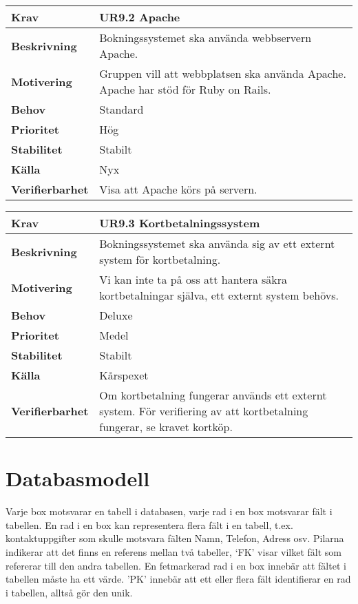 \documentclass[a4paper, twoside, 11pt, titlepage]{article}
\begin{document}
		\begin{tabular} { p{2.6cm} p{12.5cm} }
			\hline
			\sffamily\textbf{Krav} & \sffamily\textbf{UR9.2 Apache } \\
			\hline
			\sffamily\textbf{Beskrivning} & Bokningssystemet ska använda webbservern Apache.  \\
			\hline
			\sffamily\textbf{Motivering} & Gruppen vill att webbplatsen ska använda Apache. Apache har stöd för Ruby on Rails.  \\
			\hline
			\sffamily\textbf{Behov} & Standard  \\
			\hline
			\sffamily\textbf{Prioritet} & Hög  \\
			\hline
			\sffamily\textbf{Stabilitet} & Stabilt  \\
			\hline
			\sffamily\textbf{Källa} & Nyx  \\
			\hline
			\sffamily\textbf{Verifierbarhet} & Visa att Apache körs på servern.  \\
			\hline
		\end{tabular}
		\vspace{6mm}

		\begin{tabular} { p{2.6cm} p{12.5cm} }
			\hline
			\sffamily\textbf{Krav} & \sffamily\textbf{UR9.3 Kortbetalningssystem } \\
			\hline
			\sffamily\textbf{Beskrivning} & Bokningssystemet ska använda sig av ett externt system för kortbetalning.  \\
			\hline
			\sffamily\textbf{Motivering} & Vi kan inte ta på oss att hantera säkra kortbetalningar själva, ett externt system behövs.  \\
			\hline
			\sffamily\textbf{Behov} & Deluxe  \\
			\hline
			\sffamily\textbf{Prioritet} & Medel  \\
			\hline
			\sffamily\textbf{Stabilitet} & Stabilt  \\
			\hline
			\sffamily\textbf{Källa} & Kårspexet  \\
			\hline
			\sffamily\textbf{Verifierbarhet} & Om kortbetalning fungerar används ett externt system. För verifiering av att kortbetalning fungerar, se kravet kortköp.  \\
			\hline
		\end{tabular}


\clearpage
	\appendix

\clearpage
\section{Databasmodell}


Varje box motsvarar en tabell i databasen, varje rad i en box motsvarar fält i tabellen. En rad i en box kan representera flera fält i en tabell, t.ex. kontaktuppgifter som skulle motsvara fälten Namn, Telefon, Adress osv. Pilarna indikerar att det finns en referens mellan två tabeller, ‘FK’ visar vilket fält som refererar till den andra tabellen. En fetmarkerad rad i en box innebär att fältet i tabellen måste ha ett värde. 'PK' innebär att ett eller flera fält identifierar en rad i tabellen, alltså gör den unik.
\end{document}
